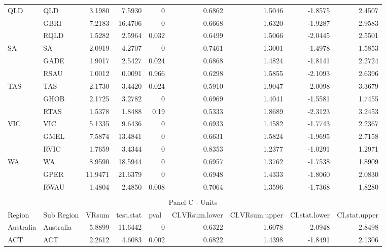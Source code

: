\begin{table}[htbp]
{\begin{tabular}{llrrrrrrr}
    \multirow{3}[0]{*}{QLD} & QLD   & 3.1980 & 7.5930 & 0     & 0.6862 & 1.5046 & -1.8575 & 2.4507 \\
          & GBRI  & 7.2183 & 16.4706 & 0     & 0.6668 & 1.6320 & -1.9287 & 2.9583 \\
          & RQLD  & 1.5282 & 2.5964 & 0.032 & 0.6499 & 1.5066 & -2.0445 & 2.5501 \\
    \multirow{3}[0]{*}{SA} & SA    & 2.0919 & 4.2707 & 0     & 0.7461 & 1.3001 & -1.4978 & 1.5853 \\
          & GADE  & 1.9017 & 2.5427 & 0.024 & 0.6868 & 1.4824 & -1.8141 & 2.2724 \\
          & RSAU  & 1.0012 & 0.0091 & 0.966 & 0.6298 & 1.5855 & -2.1093 & 2.6396 \\
    \multirow{3}[0]{*}{TAS} & TAS   & 2.1730 & 3.4420 & 0.024 & 0.5910 & 1.9047 & -2.0098 & 3.3679 \\
          & GHOB  & 2.1725 & 3.2782 & 0     & 0.6969 & 1.4041 & -1.5581 & 1.7455 \\
          & RTAS  & 1.5378 & 1.8488 & 0.19  & 0.5333 & 1.8689 & -2.3123 & 3.2453 \\
    \multirow{3}[0]{*}{VIC} & VIC   & 5.1335 & 9.6436 & 0     & 0.6933 & 1.4582 & -1.7743 & 2.2367 \\
          & GMEL  & 7.5874 & 13.4841 & 0     & 0.6631 & 1.5824 & -1.9695 & 2.7158 \\
          & RVIC  & 1.7659 & 3.4344 & 0     & 0.8353 & 1.2377 & -1.0291 & 1.2971 \\
    \multirow{3}[1]{*}{WA} & WA    & 8.9590 & 18.5944 & 0     & 0.6957 & 1.3762 & -1.7538 & 1.8909 \\
          & GPER  & 11.9471 & 21.6379 & 0     & 0.6948 & 1.4333 & -1.8060 & 2.0830 \\
          & RWAU  & 1.4804 & 2.4850 & 0.008 & 0.7064 & 1.3596 & -1.7368 & 1.8280 \\
    \midrule \\
    \multicolumn{9}{c}{Panel C - Units} \\
    \midrule
    Region & Sub Region & \multicolumn{1}{l}{VRsum} & \multicolumn{1}{l}{test.stat} & \multicolumn{1}{l}{pval} & \multicolumn{1}{l}{CI.VRsum.lower} & \multicolumn{1}{l}{CI.VRsum.upper} & \multicolumn{1}{l}{CI.stat.lower} & \multicolumn{1}{l}{CI.stat.upper} \\
    \midrule
    Australia & Australia & 5.8899 & 11.6442 & 0     & 0.6322 & 1.6078 & -2.0948 & 2.8498 \\
    ACT   & ACT   & 2.2612 & 4.6083 & 0.002 & 0.6822 & 1.4398 & -1.8491 & 2.1306 \\

\end{tabular}}
\end{table}

